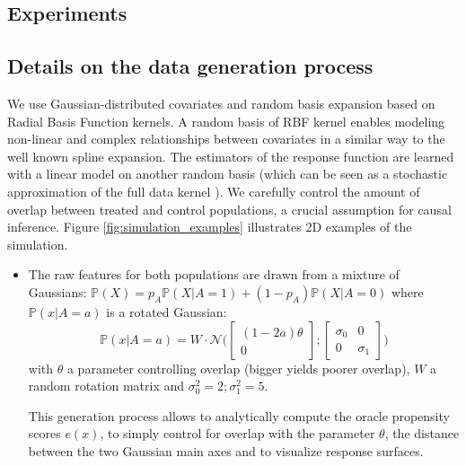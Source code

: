 \documentclass[11pt]{article}
\let\cite=\supercite
\begin{document}
\begin{appendices}
    \section{Experiments}

    \subsection{Details on the data generation process}
    \label{apd:experiments:generation}

    We use Gaussian-distributed covariates and random basis expansion based on
    Radial Basis Function kernels. A random basis of RBF kernel enables modeling
    non-linear and complex relationships between covariates in a similar way to the
    well known spline expansion. The estimators of the response function are learned
    with a linear model on another random basis (which can be seen as a stochastic
    approximation of the full data kernel \cite{rahimi_random_2008}). We carefully
    control the amount of overlap between treated and control populations, a crucial
    assumption for causal inference. Figure \ref{fig:simulation_examples}
    illustrates 2D examples of the simulation.

    \begin{itemize}
        \item The raw features for both populations are drawn from a mixture of
              Gaussians:
              $\mathbb P(X) = p_A \mathbb P(X|A=1) + (1- p_A) \mathbb P(X|A=0)$
              where $\mathbb P(x|A=a)$ is a rotated Gaussian:
              \begin{equation}
                  \mathbb P(x|A=a) = W \cdot \mathcal N \Big( \begin{bmatrix} (1-2a) \theta \\ 0\end{bmatrix} ; \begin{bmatrix} \sigma_0 & 0 \\ 0 & \sigma_1\end{bmatrix} \Big)
              \end{equation}
              with $\theta$ a parameter controlling overlap (bigger yields poorer
              overlap), $W$ a random rotation matrix and $\sigma_0^2=2;\sigma_1^2=5$.

              This generation process allows to analytically compute the oracle
              propensity scores $e(x)$, to simply control for overlap with the
              parameter $\theta$, the distance between the two Gaussian main axes and
              to  visualize response surfaces.


\end{itemize}
\end{appendices}
\end{document}

